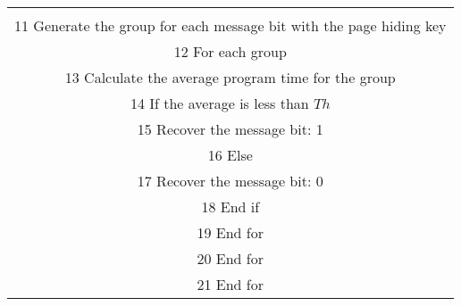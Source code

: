 \begin{footnotesize}
\begin{center}
\begin{tabular}{|c|}
\begin{minipage}[t]{3.2in}
\begin{tabbing}
\\11 \>\>Generate the group for each message bit with the page hiding key
\\12 \>\>For each group
\\13 \>\>\>Calculate the average program time for the group
\\14 \>\>\>If the average is less than $Th$
\\15 \>\>\>\>Recover the message bit: 1
\\16 \>\>\>Else
\\17 \>\>\>\>Recover the message bit: 0
\\18 \>\>\>End if
\\19 \>\>End for


\\20 \>End for
\\21 End for
\end{tabbing}
\end{minipage}
\\ \hline
\end{tabular}
\end{center}
\end{footnotesize}
